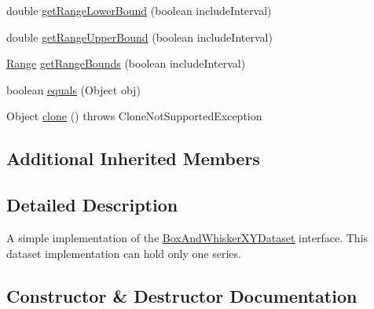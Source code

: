 \begin{DoxyCompactItemize}
\item 
double \mbox{\hyperlink{classorg_1_1jfree_1_1data_1_1statistics_1_1_default_box_and_whisker_x_y_dataset_a08d0eef5b50b12bd52c1c9298a815a3b}{get\+Range\+Lower\+Bound}} (boolean include\+Interval)
\item 
double \mbox{\hyperlink{classorg_1_1jfree_1_1data_1_1statistics_1_1_default_box_and_whisker_x_y_dataset_af4b8db18842a1e178cf7b11575cda566}{get\+Range\+Upper\+Bound}} (boolean include\+Interval)
\item 
\mbox{\hyperlink{classorg_1_1jfree_1_1data_1_1_range}{Range}} \mbox{\hyperlink{classorg_1_1jfree_1_1data_1_1statistics_1_1_default_box_and_whisker_x_y_dataset_ade8ae37e23cdb7c0b3cee5576785db74}{get\+Range\+Bounds}} (boolean include\+Interval)
\item 
boolean \mbox{\hyperlink{classorg_1_1jfree_1_1data_1_1statistics_1_1_default_box_and_whisker_x_y_dataset_ac0af8945f0b8ea9e2c60b3e09afd975a}{equals}} (Object obj)
\item 
Object \mbox{\hyperlink{classorg_1_1jfree_1_1data_1_1statistics_1_1_default_box_and_whisker_x_y_dataset_adb95eda886354a200c5cb28c7455c3e1}{clone}} ()  throws Clone\+Not\+Supported\+Exception 
\end{DoxyCompactItemize}
\subsection*{Additional Inherited Members}


\subsection{Detailed Description}
A simple implementation of the \mbox{\hyperlink{interfaceorg_1_1jfree_1_1data_1_1statistics_1_1_box_and_whisker_x_y_dataset}{Box\+And\+Whisker\+X\+Y\+Dataset}} interface. This dataset implementation can hold only one series. 

\subsection{Constructor \& Destructor Documentation}
\mbox{\label{classorg_1_1jfree_1_1data_1_1statistics_1_1_default_box_and_whisker_x_y_dataset_a31f9a719fa9aab91a976f9724d5ce30e}} 
